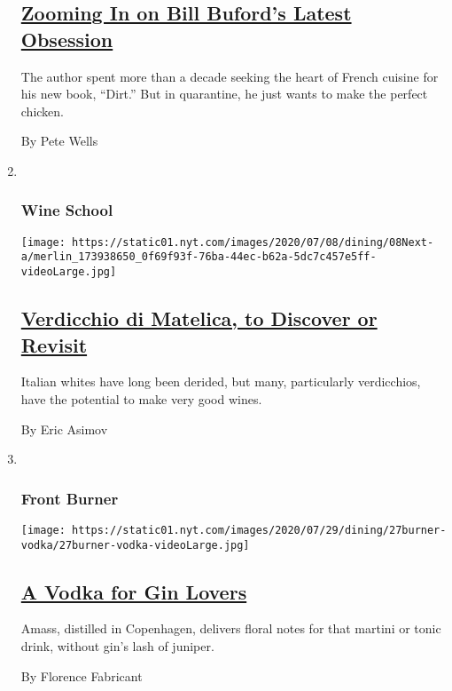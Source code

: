 \begin{enumerate}
{  \subsection{\texorpdfstring{\href{/2020/07/21/dining/bill-buford-dirt-book-chicken-recipe.html}{Zooming
  In on Bill Buford's Latest
  Obsession}}{Zooming In on Bill Buford's Latest Obsession}}\label{zooming-in-on-bill-bufords-latest-obsession}}

  The author spent more than a decade seeking the heart of French
  cuisine for his new book, ``Dirt.'' But in quarantine, he just wants
  to make the perfect chicken.

  By Pete Wells
\item ~
  \hypertarget{wine-school}{%
  \subsubsection{Wine School}\label{wine-school}}

  \texttt{[image: https://static01.nyt.com/images/2020/07/08/dining/08Next-a/merlin\_173938650\_0f69f93f-76ba-44ec-b62a-5dc7c457e5ff-videoLarge.jpg]}

  \hypertarget{verdicchio-di-matelica-to-discover-or-revisit}{%
  \subsection{\texorpdfstring{\href{/2020/07/02/dining/drinks/wine-school-assignment-verdicchio-di-matelica.html}{Verdicchio
  di Matelica, to Discover or
  Revisit}}{Verdicchio di Matelica, to Discover or Revisit}}\label{verdicchio-di-matelica-to-discover-or-revisit}}

  Italian whites have long been derided, but many, particularly
  verdicchios, have the potential to make very good wines.

  By Eric Asimov
\item ~
  \hypertarget{front-burner}{%
  \subsubsection{Front Burner}\label{front-burner}}

  \texttt{[image: https://static01.nyt.com/images/2020/07/29/dining/27burner-vodka/27burner-vodka-videoLarge.jpg]}

  \hypertarget{a-vodka-for-gin-lovers}{%
  \subsection{\texorpdfstring{\href{/2020/07/27/dining/amass-vodka.html}{A
  Vodka for Gin
  Lovers}}{A Vodka for Gin Lovers}}\label{a-vodka-for-gin-lovers}}

  Amass, distilled in Copenhagen, delivers floral notes for that martini
  or tonic drink, without gin's lash of juniper.

  By Florence Fabricant
\end{enumerate}

